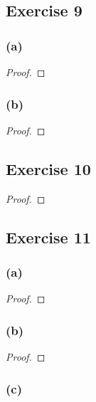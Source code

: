 \documentclass[14pt]{extarticle}
\begin{document}
\subsection{Exercise 9}

\subsubsection{(a)}

\begin{proof}

\end{proof}

\subsubsection{(b)}

\begin{proof}

\end{proof}

\subsection{Exercise 10}

\begin{proof}

\end{proof}

\subsection{Exercise 11}

\subsubsection{(a)}

\begin{proof}

\end{proof}

\subsubsection{(b)}

\begin{proof}

\end{proof}

\subsubsection{(c)}
\end{document}
